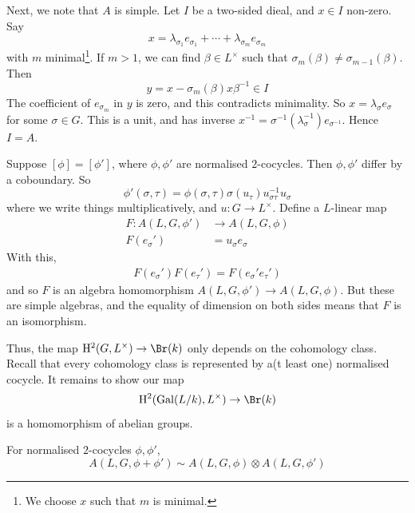 \documentclass{article}
\begin{document}
Next, we note that \(A\) is simple. Let \(I\) be a two-sided dieal, and \(x \in I\) non-zero. Say
\[x = \lambda_{\sigma_1}e_{\sigma_1} + \cdots + \lambda_{\sigma_m}e_{\sigma_m}\]
with \(m\) minimal\footnote{We choose \(x\) such that \(m\) is minimal.}. If \(m > 1\), we can find \(\beta \in L^\times\) such that \(\sigma_m(\beta) \ne \sigma_{m-1}(\beta)\). Then
\[y = x - \sigma_m(\beta)x\beta^{-1} \in I\]
The coefficient of \(e_{\sigma_m}\) in \(y\) is zero, and this contradicts minimality. So \(x = \lambda_\sigma e_\sigma\) for some \(\sigma \in G\). This is a unit, and has inverse \(x^{-1} = \sigma^{-1}(\lambda_\sigma^{-1})e_{\sigma^{-1}}\). Hence \(I = A\).

\lec

Suppose \([\phi] = [\phi']\), where \(\phi, \phi'\) are normalised \(2\)-cocycles. Then \(\phi, \phi'\) differ by a coboundary. So
\[\phi'(\sigma, \tau) = \phi(\sigma, \tau)\sigma(u_\tau)u_{\sigma\tau}^{-1}u_\sigma\]
where we write things multiplicatively, and \(u : G \to L^\times\). Define a \(L\)-linear map
\begin{align*}
    F : A(L, G, \phi') &\to A(L, G, \phi) \\
    F(e_\sigma') &= u_\sigma e_\sigma
\end{align*}
With this,
\begin{align*}
    F(e_\sigma')F(e_\tau') = F(e_\sigma'e_\tau')
\end{align*}
and so \(F\) is an algebra homomorphism \(A(L, G, \phi') \to A(L, G, \phi)\). But these are simple algebras, and the equality of dimension on both sides means that \(F\) is an isomorphism.

Thus, the map \(\HH^2(G, L^\times) \to \Br(k)\) only depends on the cohomology class. Recall that every cohomology class is represented by a(t least one) normalised cocycle. It remains to show our map
\[\HH^2(\Gal(L/k), L^\times) \to \Br(k)\]
is a homomorphism of abelian groups.

\begin{lemma}
    For normalised \(2\)-cocycles \(\phi, \phi'\),
    \[A(L, G, \phi + \phi') \sim A(L, G, \phi) \otimes A(L, G, \phi')\]
\end{lemma}
\end{document}
